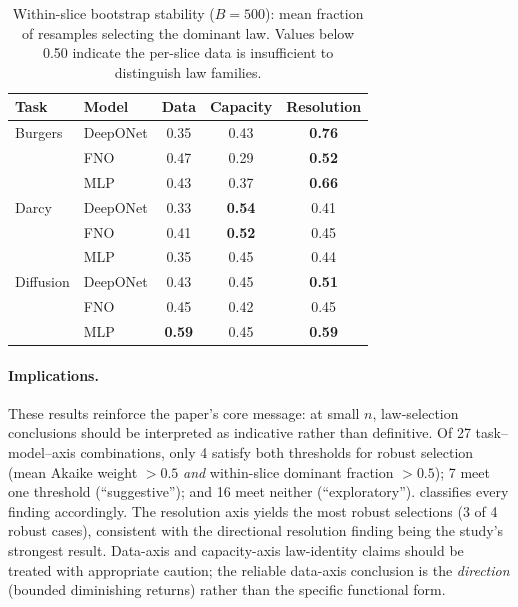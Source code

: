 \documentclass[11pt]{article}
\begin{document}
\begin{table}[h]
\centering
\caption{Within-slice bootstrap stability ($B=500$): mean fraction of
resamples selecting the dominant law. Values below 0.50 indicate the
per-slice data is insufficient to distinguish law families.}
\label{tab:within-slice}
\small
\begin{tabular}{@{}llccc@{}}
\toprule
\textbf{Task} & \textbf{Model} & \textbf{Data} &
\textbf{Capacity} & \textbf{Resolution} \\
\midrule
Burgers & DeepONet & 0.35 & 0.43 & \textbf{0.76} \\
        & FNO      & 0.47 & 0.29 & \textbf{0.52} \\
        & MLP      & 0.43 & 0.37 & \textbf{0.66} \\
\midrule
Darcy   & DeepONet & 0.33 & \textbf{0.54} & 0.41 \\
        & FNO      & 0.41 & \textbf{0.52} & 0.45 \\
        & MLP      & 0.35 & 0.45 & 0.44 \\
\midrule
Diffusion & DeepONet & 0.43 & 0.45 & \textbf{0.51} \\
          & FNO      & 0.45 & 0.42 & 0.45 \\
          & MLP      & \textbf{0.59} & 0.45 & \textbf{0.59} \\
\bottomrule
\end{tabular}
\end{table}

\paragraph{Implications.}
These results reinforce the paper's core message: at small $n$,
law-selection conclusions should be interpreted as indicative
rather than definitive. Of 27 task--model--axis combinations, only
4 satisfy both thresholds for robust selection (mean Akaike weight
$>0.5$ \emph{and} within-slice dominant fraction $>0.5$); 7 meet
one threshold (``suggestive''); and 16 meet neither (``exploratory'').
 classifies every finding accordingly.
The resolution axis yields the most robust selections
(3 of 4 robust cases), consistent with the directional resolution
finding being the study's strongest result.
Data-axis and capacity-axis law-identity claims should be treated
with appropriate caution; the reliable data-axis conclusion is
the \emph{direction} (bounded diminishing returns) rather than
the specific functional form.
\end{document}
